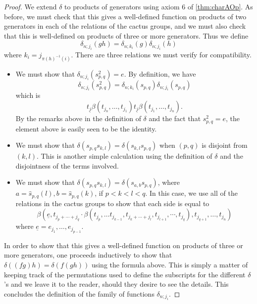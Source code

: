 \begin{proof}
We extend $\delta$ to products of generators using axiom 6 of \cref{thm:charAOp}. As before, we must check that this gives a well-defined function on products of two generators in each of the relations of the cactus groups, and we must also check that this is well-defined on products of three or more generators. Thus we define
  \[
    \delta_{n; j_{i}}(gh) = \delta_{n; k_{i}}(g)\delta_{n; j_{i}}(h)
  \]
where $k_{i} = j_{\pi(h)^{-1}(i)}$. There are three relations we must verify for compatibility.
\begin{itemize}
\item We must show that $\delta_{n; j_{i}}\left(s_{p,q}^{2}\right) = e$. By definition, we have
  \[
    \delta_{n; j_{i}}\left(s_{p,q}^{2}\right) = \delta_{n; k_{i}}\left(s_{p,q}\right)\delta_{n; j_{i}}\left(s_{p,q}\right)
  \]
which is
  \[
    t_{\underline{j}}\beta(t_{j_{n}}, \ldots, t_{j_{1}}) t_{\underline{j}} \beta(t_{j_{1}}, \ldots, t_{j_{n}}).
  \]
By the remarks above in the definition of $\delta$ and the fact that $s_{p,q}^{2}=e$, the element above is easily seen to be the identity.
\item We must show that $\delta(s_{p,q}s_{k,l}) = \delta(s_{k,l}s_{p,q})$ when $(p,q)$ is disjoint from $(k,l)$. This is another simple calculation using the definition of $\delta$ and the disjointness of the terms involved.
\item We must show that $\delta(s_{p,q}s_{k,l}) = \delta(s_{a,b}s_{p,q})$,  where $a = \hat{s}_{p,q}(l), b = \hat{s}_{p,q}(k)$, if $p < k < l < q$. In this case, we use all of the relations in the cactus groups to show that each side is equal to
  \[
    \beta\left(\underline{e}, t_{j_{p}+\cdots + j_{q}} \cdot \beta \left(t_{j_{p}}, \ldots t_{j_{k-1}}, t_{j_{k}+ \cdots +j_{l}}, t_{j_{l+1}}, \cdots, t_{j_{q}}\right), t_{j_{q+1}}, \ldots, t_{j_{n}}\right)
  \]
where $\underline{e} = e_{j_{1}}, \ldots, e_{j_{p-1}}$.
\end{itemize}
In order to show that this gives a well-defined function on products of three or more generators, one proceeds inductively to show that $\delta\left((fg)h\right) = \delta\left(f(gh)\right)$ using the formula above. This is simply a matter of keeping track of the permutations used to define the subscripts for the different $\delta$'s and we leave it to the reader, should they desire to see the details. This concludes the definition of the family of functions $\delta_{n; j_{i}}$.


\end{proof}
